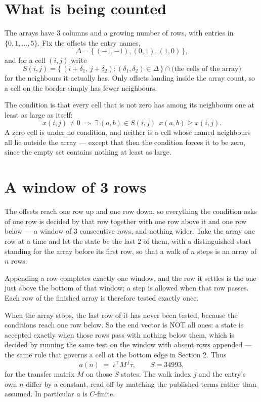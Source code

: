 \documentclass[11pt,a4paper]{article}
\theoremstyle{plain}
\theoremstyle{definition}
\begin{document}
\section{What is being counted}

The arrays have $3$ columns and a growing number of rows, with entries in $\{0,1,\dots,5\}$. Fix the
offsets the entry names,
\[
\Delta=\{\,(-1,-1), (0,1), (1,0)\,\},
\]
and for a cell $(i,j)$ write
\[
S(i,j)=\{\,(i+\delta_1,\,j+\delta_2) : (\delta_1,\delta_2)\in\Delta\,\}\cap
\text{(the cells of the array)}
\]
for the neighbours it actually has. Only offsets landing inside the array count, so a cell on
the border simply has fewer neighbours.

The condition is that every cell that is not zero has among its neighbours one at least as large as itself:
\[
x(i,j)\neq0\ \Longrightarrow\ \exists\,(a,b)\in S(i,j)\ \ x(a,b)\ge x(i,j).
\]
A zero cell is under no condition, and neither is a cell whose named neighbours all lie outside the array --- except that then the condition forces it to be zero, since the empty set contains nothing at least as large.

\section{A window of 3 rows}

The offsets reach one row up and one row down, so everything the condition asks of one row is
decided by that row together with one row above it and one row below --- a window of
$3$ consecutive rows, and nothing wider. Take the array one row at a time and
let the state be the last 2 of them, with a distinguished start standing for the array before its
first row, so that a walk of $n$ steps is an array of $n$ rows.

Appending a row completes exactly one window, and the row it settles is the one just above the bottom of that window; a step is
allowed when that row passes. Each row of the finished array is therefore tested exactly once.

When the array stops, the last row of it has never been tested, because the
conditions reach one row below. So the end vector is NOT all ones: a state is accepted exactly when
those rows pass with nothing below them, which is decided by running the same test on the window
with absent rows appended --- the same rule that governs a cell at the bottom edge in
Section 2.
Thus
\[
a(n)\;=\;\iota^{\!\top}M^{\,j}\tau ,\qquad S=34993,
\]
for the transfer matrix $M$ on those $S$ states. The walk index $j$ and the entry's own $n$
differ by a constant, read off by matching the published terms rather than assumed. In
particular $a$ is $C$-finite.
\end{document}
